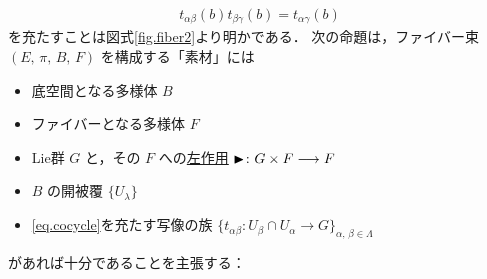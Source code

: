 \documentclass[TQFT_main]{subfiles}
\begin{document}
\begin{align}
	\label{eq.cocycle}
	t_{\alpha\beta}(b) t_{\beta\gamma}(b) = t_{\alpha\gamma}(b)
\end{align}
を充たすことは図式\ref{fig.fiber2}より明かである．
次の命題は，ファイバー束 $(E,\, \pi,\, B,\, F)$ を構成する「素材」には
\begin{itemize}
	\item 底空間となる\cinfty 多様体 $B$
	\item ファイバーとなる\cinfty 多様体 $F$
	\item Lie群 $G$ と，その $F$ への\hyperref[def:Lie-action]{左作用} $\blacktriangleright \colon G \times F \longrightarrow F$
	\item $B$ の開被覆 $\{ U_\lambda \}$
	\item \eqref{eq.cocycle}を充たす\cinfty 写像の族 $\{t_{\alpha\beta} \colon U_\beta \cap U_\alpha \to G\}_{\alpha,\, \beta \in \Lambda}$
\end{itemize}
があれば十分であることを主張する：
\end{document}
